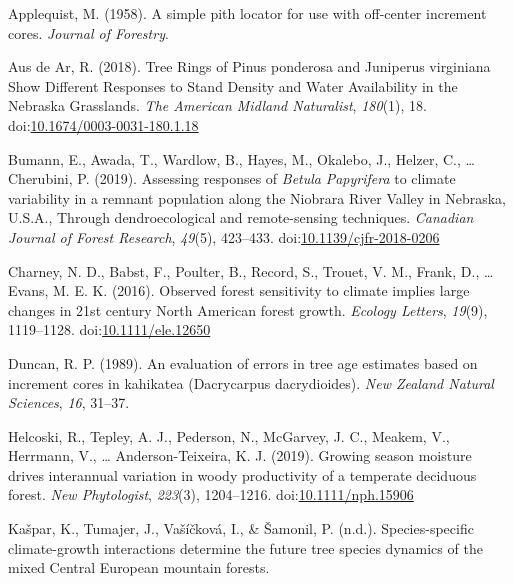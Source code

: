 \documentclass[
]{article}
\newlength{\cslhangindent}
\newenvironment{cslreferences}%
  {\setlength{\parindent}{0pt}%
  \everypar{\setlength{\hangindent}{\cslhangindent}}\ignorespaces}%
  {\par}
\begin{document}
\hypertarget{refs}{}
\begin{cslreferences}
\leavevmode\hypertarget{ref-applequist_simple_1958}{}%
Applequist, M. (1958). A simple pith locator for use with off-center
increment cores. \emph{Journal of Forestry}.

\leavevmode\hypertarget{ref-aus_de_ar_tree_2018}{}%
Aus de Ar, R. (2018). Tree Rings of Pinus ponderosa and Juniperus
virginiana Show Different Responses to Stand Density and Water
Availability in the Nebraska Grasslands. \emph{The American Midland
Naturalist}, \emph{180}(1), 18.
doi:\href{https://doi.org/10.1674/0003-0031-180.1.18}{10.1674/0003-0031-180.1.18}

\leavevmode\hypertarget{ref-bumann_assessing_2019}{}%
Bumann, E., Awada, T., Wardlow, B., Hayes, M., Okalebo, J., Helzer, C.,
\ldots{} Cherubini, P. (2019). Assessing responses of \emph{Betula}
\emph{Papyrifera} to climate variability in a remnant population along
the Niobrara River Valley in Nebraska, U.S.A., Through dendroecological
and remote-sensing techniques. \emph{Canadian Journal of Forest
Research}, \emph{49}(5), 423--433.
doi:\href{https://doi.org/10.1139/cjfr-2018-0206}{10.1139/cjfr-2018-0206}

\leavevmode\hypertarget{ref-charney_observed_2016}{}%
Charney, N. D., Babst, F., Poulter, B., Record, S., Trouet, V. M.,
Frank, D., \ldots{} Evans, M. E. K. (2016). Observed forest sensitivity
to climate implies large changes in 21st century North American forest
growth. \emph{Ecology Letters}, \emph{19}(9), 1119--1128.
doi:\href{https://doi.org/10.1111/ele.12650}{10.1111/ele.12650}

\leavevmode\hypertarget{ref-duncan_evaluation_1989}{}%
Duncan, R. P. (1989). An evaluation of errors in tree age estimates
based on increment cores in kahikatea (Dacrycarpus dacrydioides).
\emph{New Zealand Natural Sciences}, \emph{16}, 31--37.

\leavevmode\hypertarget{ref-helcoski_growing_2019}{}%
Helcoski, R., Tepley, A. J., Pederson, N., McGarvey, J. C., Meakem, V.,
Herrmann, V., \ldots{} Anderson-Teixeira, K. J. (2019). Growing season
moisture drives interannual variation in woody productivity of a
temperate deciduous forest. \emph{New Phytologist}, \emph{223}(3),
1204--1216.
doi:\href{https://doi.org/10.1111/nph.15906}{10.1111/nph.15906}

\leavevmode\hypertarget{ref-kaspar_species-specific_nodate}{}%
Kašpar, K., Tumajer, J., Vašíčková, I., \& Šamonil, P. (n.d.).
Species-specific climate-growth interactions determine the future tree
species dynamics of the mixed Central European mountain forests.


\end{cslreferences}
\end{document}
